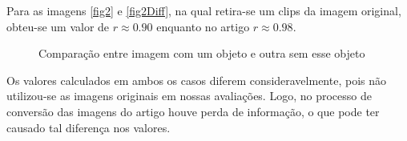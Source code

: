 \documentclass[10pt,a4paper]{article}
\begin{document}
Para as imagens \ref{fig2} e \ref{fig2Diff}, na qual retira-se um
clips da imagem original, obteu-se um valor de $r\approx 0.90$
enquanto no artigo $r\approx 0.98$.

\begin{figure}[h!]
  \begin{center}
    \hspace{10mm}
    \caption{Comparação entre imagem com um objeto e outra sem esse objeto
    }
  \end{center}
\end{figure}

Os valores calculados em ambos os casos diferem consideravelmente, pois não utilizou-se
as imagens originais em nossas avaliações. Logo, no processo de conversão das imagens do
artigo houve perda de informação, o que pode ter causado tal diferença
nos valores.
\end{document}
